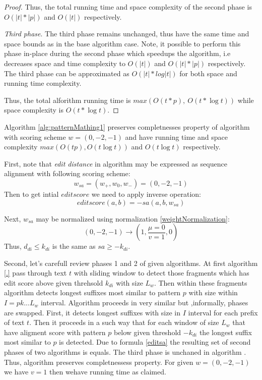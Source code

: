 \begin{proof}
Thus, the total running time and space complexity of the second phase is $O(|t|*|p|)$ and $O(|t|)$ respectively.

\emph{Third phase}.
The third phase remains unchanged, thus have the same time and space bounds as in the base algorithm case.
Note, it possible to perform this phase in-place during the second phase which speedups the algorithm, i.e decreases space and time complexity to $O(|t|)$ and $O(|t|*|p|)$ respectively.
The third phase can be approximated as $O(|t| * log|t|)$ for both space and running time complexity.

Thus, the total alforithm running time is $max(O(t * p),\ O(t * \log t))$ while space complexity is $O(t * \log t)$.
\end{proof}

\begin{theorem}
Algorithm \ref{alg:patternMathing1} preserves completnesses property of algorithm \cite{luciv2019interactive} with scoring scheme  $w = (0,-2,-1)$ and have running time and space complexity $max(O(tp),O(t \log t))$ and $O(t \log t)$  respectively.
\end{theorem}

First, note  that \emph{edit distance} in algorithm \cite{.} may be expressed as sequence alignment  with following scoring scheme: 
\begin{displaymath}
w_{sa}=(w_{+},w_{0},w_{-}) = (0,-2,-1)
\end{displaymath}
Then to get intial $edit score$ we need to apply inverse operation:
\begin{equation}\label{editsa}
editscore(a,b) = -sa(a,b,w_{sa}) 
\end{equation}

Next, $w_{sa}$ may be normalized using normalization \ref{weightNormalization}:
\begin{displaymath}
(0, -2, -1) \rightarrow (1,\frac{\mu=0}{v=1}, 0)
\end{displaymath}
Thus, $d_{di} \leq k_{di}$ is the same as $sa \geq -k_{di}$.

Second, let's carefull review phases 1 and 2 of given algorithms.
At first algorithm \ref{.} pass through text $t$ with sliding window to detect those fragments which has edit score above given threhsold $k_{di}$ with size $L_{w}$.
Then within these fragments algorithm detects longest suffixes most similar to pattern $p$ with size within  $I=pk...L_{w}$ interval.
Algorithm \cite{.} proceeds in very similar but ,informally, phases are swapped.
First, it detects longest suffixes with size in $I$ interval for each prefix of text $t$.
Then it proceeds in a such way that for each window of size $L_{w}$ that have aligment score with pattern $p$ below given threshold $-k_{di}$  the longest suffix most similar to $p$ is detected.
Due to formula  \ref{editsa} the resulting set of second phases of two algorithms is equals.
The third phase is unchaned in algorithm \cite{.}.
Thus, algorithm \cite{}  preserves  completnessess property.
For given $w = (0,-2,-1)$ we have $v=1$ then wehave running time as claimed.


